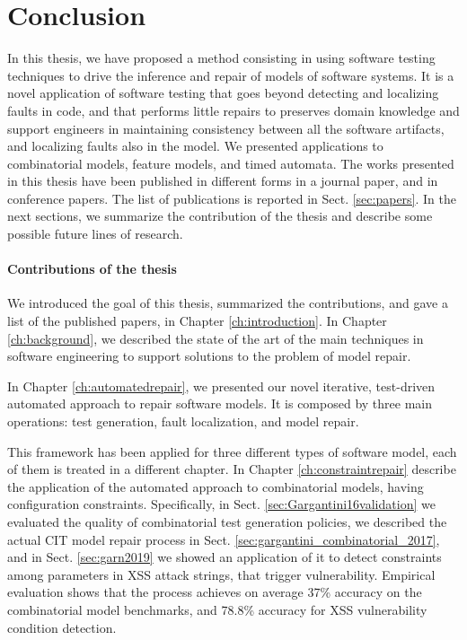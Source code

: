 \begin{tikzborder}{\cite{Gargantini16:validation}}
\begin{tikzborder}{\cite{gargantini_combinatorial_2017}}
\begin{tikzborder}{\cite{gargantini_combinatorial_2017}}
\begin{tikzborder}{\cite{garn2019}}
\begin{tikzborder}{\cite{arcaini2019achieving}}
\chapter{Conclusion}
In this thesis, we have proposed a method consisting in using software testing techniques to drive the inference and repair of models of software systems.
It is a novel application of software testing that goes beyond detecting and localizing faults in code, and that performs little repairs to preserves domain knowledge and support engineers in maintaining consistency between all the software artifacts, and localizing faults also in the model. 
We presented applications to combinatorial models, feature models, and timed automata. 
The works presented in this thesis have been published in different forms in a journal paper, and in conference papers. The list of publications is reported in Sect. \ref{sec:papers}.
In the next sections, we summarize the contribution of the thesis and describe some possible future lines of research.

\subsubsection{Contributions of the thesis}
We introduced the goal of this thesis, summarized the contributions, and gave a list of the published papers, in Chapter \ref{ch:introduction}.
In Chapter \ref{ch:background}, we described the state of the art of the main techniques in software engineering to support solutions to the problem of model repair.

In Chapter \ref{ch:automatedrepair}, we presented our novel iterative, test-driven automated approach to repair software models. It is composed by three main operations: test generation, fault localization, and model repair.

This framework has been applied for three different types of software model, each of them is treated in a different chapter.
In Chapter \ref{ch:constraintrepair} describe the application of the automated approach to combinatorial models, having configuration constraints. Specifically, in Sect. \ref{sec:Gargantini16validation} we evaluated the quality of combinatorial test generation policies, we described the actual CIT model repair process in Sect. \ref{sec:gargantini_combinatorial_2017}, and in Sect. \ref{sec:garn2019} we showed an application of it to detect constraints among parameters in XSS attack strings, that trigger vulnerability.
Empirical evaluation shows that the process achieves on average 37\% accuracy on the combinatorial model benchmarks, and 78.8\% accuracy for XSS vulnerability condition detection.


\end{tikzborder}
\end{tikzborder}
\end{tikzborder}
\end{tikzborder}
\end{tikzborder}
